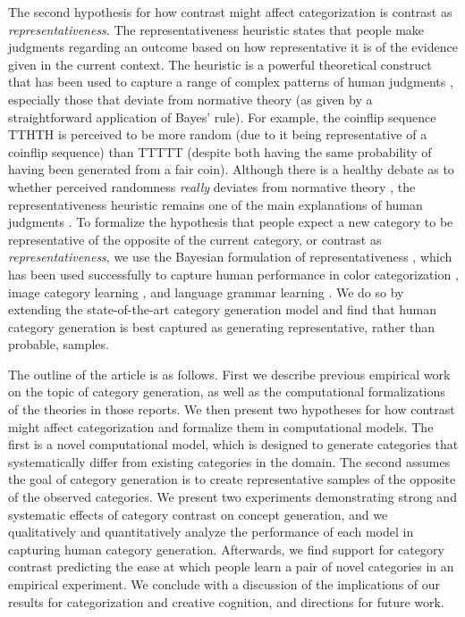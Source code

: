 \documentclass[12pt]{article}
\begin{document}
\begin{flushleft}
The second hypothesis for how contrast might affect categorization is contrast
as {\em representativeness}. The representativeness heuristic \citep{kahneman73}
states that people make judgments regarding an outcome based on how
representative it is of the evidence given in the current context. The heuristic
is a powerful theoretical construct that has been used to capture a range of
complex patterns of human judgments \citep{kahneman73,tversky74,tversky83},
especially those that deviate from normative theory (as given by a
straightforward application of Bayes' rule). For example, the coinflip sequence
TTHTH is perceived to be more random (due to it being representative of a
coinflip sequence) than TTTTT (despite both having the same probability of
having been generated from a fair coin). Although there is a healthy debate as
to whether perceived randomness {\em really} deviates from normative theory
\citep{griffiths18,hahn09}, the representativeness heuristic remains one of the
main explanations of human judgments \citep{reimers18}. To formalize the
hypothesis that people expect a new category to be representative of the
opposite of the current category, or contrast as {\em representativeness}, we
use the Bayesian formulation of representativeness \citep{tenenbaum01}, which
has been used successfully to capture human performance in color categorization
\citep{abbott16}, image category learning \citep{abbott11}, and language grammar
learning \citep{rafferty10}. We do so by extending the state-of-the-art category
generation model \citep{jern2013probabilistic} and find that human category
generation is best captured as generating representative, rather than probable,
samples.

The outline of the article is as follows. First we describe previous empirical
work on the topic of category generation, as well as the computational
formalizations of the theories in those reports. We then present two hypotheses
for how contrast might affect categorization and formalize them in computational
models. The first is a novel computational model, which is designed to generate
categories that systematically differ from existing categories in the domain.
The second assumes the goal of category generation is to create representative
samples of the opposite of the observed categories. We present two experiments
demonstrating strong and systematic effects of category contrast on concept
generation, and we qualitatively and quantitatively analyze the performance of
each model in capturing human category generation. Afterwards, we find support
for category contrast predicting the ease at which people learn a pair of novel
categories in an empirical experiment. We conclude with a discussion of the
implications of our results for categorization and creative cognition, and
directions for future work.


\end{flushleft}
\end{document}
